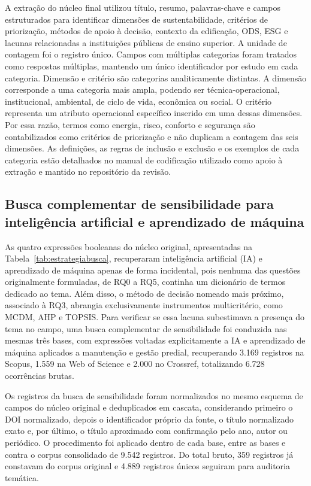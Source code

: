 A extração do núcleo final utilizou título, resumo, palavras-chave e campos estruturados para identificar dimensões de sustentabilidade, critérios de priorização, métodos de apoio à decisão, contexto da edificação, ODS, ESG e lacunas relacionadas a instituições públicas de ensino superior. A unidade de contagem foi o registro único. Campos com múltiplas categorias foram tratados como respostas múltiplas, mantendo um único identificador por estudo em cada categoria. Dimensão e critério são categorias analiticamente distintas. A dimensão corresponde a uma categoria mais ampla, podendo ser técnica-operacional, institucional, ambiental, de ciclo de vida, econômica ou social. O critério representa um atributo operacional específico inserido em uma dessas dimensões. Por essa razão, termos como energia, risco, conforto e segurança são contabilizados como critérios de priorização e não duplicam a contagem das seis dimensões. As definições, as regras de inclusão e exclusão e os exemplos de cada categoria estão detalhados no manual de codificação utilizado como apoio à extração e mantido no repositório da revisão.

\subsection{Busca complementar de sensibilidade para inteligência artificial e aprendizado de máquina}
\label{sec:buscaia}

As quatro expressões booleanas do núcleo original, apresentadas na Tabela~\ref{tab:estrategiabusca}, recuperaram inteligência artificial (IA) e aprendizado de máquina apenas de forma incidental, pois nenhuma das questões originalmente formuladas, de RQ0 a RQ5, continha um dicionário de termos dedicado ao tema. Além disso, o método de decisão nomeado mais próximo, associado à RQ3, abrangia exclusivamente instrumentos multicritério, como MCDM, AHP e TOPSIS. Para verificar se essa lacuna subestimava a presença do tema no campo, uma busca complementar de sensibilidade foi conduzida nas mesmas três bases, com expressões voltadas explicitamente a IA e aprendizado de máquina aplicados a manutenção e gestão predial, recuperando 3.169 registros na Scopus, 1.559 na Web of Science e 2.000 no Crossref, totalizando 6.728 ocorrências brutas.

Os registros da busca de sensibilidade foram normalizados no mesmo esquema de campos do núcleo original e deduplicados em cascata, considerando primeiro o DOI normalizado, depois o identificador próprio da fonte, o título normalizado exato e, por último, o título aproximado com confirmação pelo ano, autor ou periódico. O procedimento foi aplicado dentro de cada base, entre as bases e contra o corpus consolidado de 9.542 registros. Do total bruto, 359 registros já constavam do corpus original e 4.889 registros únicos seguiram para auditoria temática.

